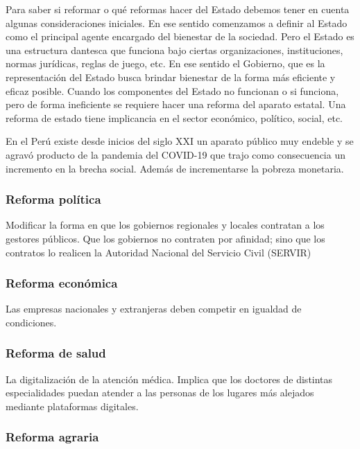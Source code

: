 \documentclass[
  jou,
  floatsintext,
  longtable,
  a4paper,
  nolmodern,
  notxfonts,
  notimes,
  12pt,
  colorlinks=true,linkcolor=blue,citecolor=blue,urlcolor=blue]{apa7}
\begin{document}
Para saber si reformar o qué reformas hacer del Estado debemos tener en
cuenta algunas consideraciones iniciales. En ese sentido comenzamos a
definir al Estado como el principal agente encargado del bienestar de la
sociedad. Pero el Estado es una estructura dantesca que funciona bajo
ciertas organizaciones, instituciones, normas jurídicas, reglas de
juego, etc. En ese sentido el Gobierno, que es la representación del
Estado busca brindar bienestar de la forma más eficiente y eficaz
posible. Cuando los componentes del Estado no funcionan o si funciona,
pero de forma ineficiente se requiere hacer una reforma del aparato
estatal. Una reforma de estado tiene implicancia en el sector económico,
político, social, etc.

En el Perú existe desde inicios del siglo XXI un aparato público muy
endeble y se agravó producto de la pandemia del COVID-19 que trajo como
consecuencia un incremento en la brecha social. Además de incrementarse
la pobreza monetaria.

\subsubsection{Reforma política}\label{reforma-poluxedtica}

Modificar la forma en que los gobiernos regionales y locales contratan a
los gestores públicos. Que los gobiernos no contraten por afinidad; sino
que los contratos lo realicen la Autoridad Nacional del Servicio Civil
(SERVIR)

\subsubsection{Reforma económica}\label{reforma-econuxf3mica}

Las empresas nacionales y extranjeras deben competir en igualdad de
condiciones.

\subsubsection{Reforma de salud}\label{reforma-de-salud}

La digitalización de la atención médica. Implica que los doctores de
distintas especialidades puedan atender a las personas de los lugares
más alejados mediante plataformas digitales.

\subsubsection{Reforma agraria}\label{reforma-agraria}
\end{document}
